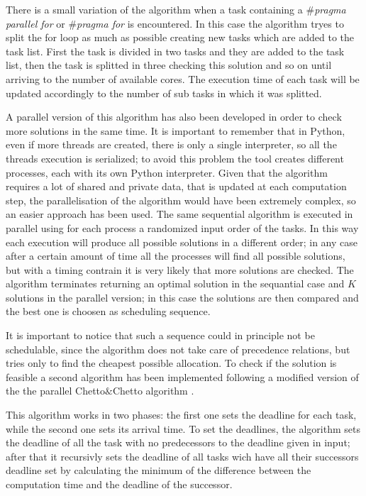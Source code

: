 \documentclass[a4paper,11pt,oneside]{book}
\begin{document}
There is a small variation of the algorithm when a task containing a \emph{$\#$pragma parallel for} or \emph{$\#$pragma for} is encountered. In this case the algorithm tryes to split the for loop as much as possible creating new tasks which are added to the task list. First the task is divided in two tasks and they are added to the task list, then the task is splitted in three checking this solution and so on until arriving to the number of available cores. The execution time of each task will be updated accordingly to the number of sub tasks in which it was splitted. 

A parallel version of this algorithm has also been developed in order to check more solutions in the same time. It is important to remember that in Python, even if more threads are created, there is only a single interpreter, so all the threads execution is serialized; to avoid this problem the tool creates different processes, each with its own Python interpreter. Given that the algorithm requires a lot of shared and private data, that is updated at each computation step, the parallelisation of the algorithm would have been extremely complex, so an easier approach has been used. The same sequential algorithm is executed in parallel using for each process a randomized input order of the tasks. In this way each execution will produce all possible solutions in a different order; in any case after a certain amount of time all the processes will find all possible solutions, but with a timing contrain it is very likely that  more solutions are checked. The algorithm terminates returning an optimal solution in the sequantial case and $K$ solutions in the parallel version; in this case the solutions are then compared and the best one is choosen as scheduling sequence.

It is important to notice that such a sequence could in principle not be schedulable, since the algorithm does not take care of precedence relations, but tries only to find the cheapest possible allocation. To check if the solution is feasible a second algorithm has been implemented following a modified version of the the parallel Chetto$\&$Chetto algorithm \cite{bbw2}.

This algorithm works in two phases: the first one sets the deadline for each task, while the second one sets its arrival time. To set the deadlines, the algorithm sets the deadline of all the task with no predecessors to the deadline given in input; after that it recursivly sets the deadline of all tasks wich have all their successors deadline set by calculating the minimum of the difference between the computation time and the deadline of the successor. 
\end{document}
